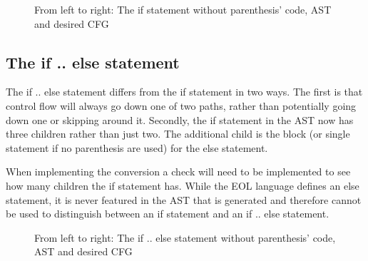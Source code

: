 \begin{figure}
\centering
\begin{minipage}{.3\textwidth}
  \centering
  
\end{minipage}%
\begin{minipage}{.3\textwidth}
  \centering
\end{minipage}
\begin{minipage}{.3\textwidth}
  \centering
\end{minipage}
\caption{From left to right: The if statement without parenthesis' code, AST and desired CFG}
\label{fig:ifnoparen}
\end{figure}

\subsection{The if .. else statement}

The if .. else statement differs from the if statement in two ways. The first is that control flow will always go down one of two paths, rather than potentially going down one or skipping around it. Secondly, the if statement in the AST now has three children rather than just two. The additional child is the block (or single statement if no parenthesis are used) for the else statement.

When implementing the conversion a check will need to be implemented to see how many children the if statement has. While the EOL language defines an else statement, it is never featured in the AST that is generated and therefore cannot be used to distinguish between an if statement and an if .. else statement.

\begin{figure}
\centering
\begin{minipage}{.3\textwidth}
  \centering
  
\end{minipage}%
\begin{minipage}{.3\textwidth}
  \centering
\end{minipage}
\begin{minipage}{.3\textwidth}
  \centering
\end{minipage}
\caption{From left to right: The if .. else statement without parenthesis' code, AST and desired CFG}
\label{fig:ifelse}
\end{figure}

